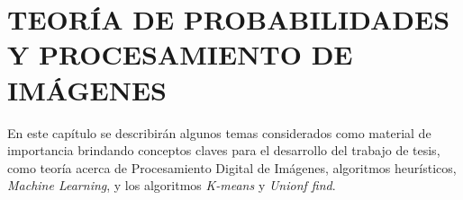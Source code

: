 \chapter{TEORÍA DE PROBABILIDADES Y PROCESAMIENTO DE IMÁGENES}
\label{cap:marcoteorico}
\setcounter{secnumdepth}{0}
  En este capítulo se describirán algunos temas considerados como material de 
  importancia brindando conceptos claves para el desarrollo del trabajo de 
  tesis, como teoría acerca de Procesamiento Digital de Imágenes, algoritmos 
  heurísticos, \textit{Machine Learning}, y los algoritmos \textit{K-means} 
  y \textit{Unionf find}.

\setcounter{secnumdepth}{3}  
